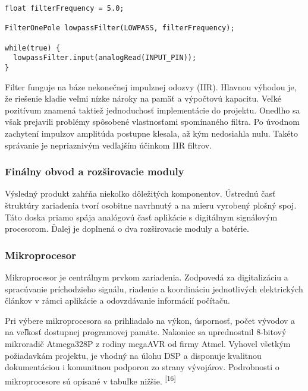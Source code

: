 \documentclass[titlepage,12pt]{article}
\begin{document}
\begin{lstlisting}
float filterFrequency = 5.0; 

FilterOnePole lowpassFilter(LOWPASS, filterFrequency);

while(true) {
  lowpassFilter.input(analogRead(INPUT_PIN));
}
\end{lstlisting}

Filter funguje na báze nekonečnej impulznej odozvy (IIR). Hlavnou výhodou je, že riešenie kladie veľmi nízke nároky na pamäť a výpočtovú kapacitu. Veľké pozitívum znamená taktiež jednoduchosť implementácie do projektu. Onedlho sa však prejavili problémy spôsobené vlastnosťami spomínaného filtra. Po úvodnom zachytení impulzov amplitúda postupne klesala, až kým nedosiahla nulu. Takéto správanie je nepriaznivým vedľajším účinkom IIR filtrov. 

\newpage
\subsubsection{Finálny obvod a rozširovacie moduly}
Výsledný produkt zahŕňa niekoľko dôležitých komponentov. Ústrednú časť štruktúry \linebreak zariadenia tvorí osobitne navrhnutý a na mieru vyrobený plošný spoj. Táto doska priamo spája analógovú časť aplikácie s digitálnym signálovým procesorom. Ďalej je doplnená o dva rozširovacie moduly a batérie.

\subsubsection*{Mikroprocesor}
Mikroprocesor je centrálnym prvkom zariadenia. Zodpovedá za digitalizáciu a spracúvanie príchodzieho signálu, riadenie a koordináciu jednotlivých elektrických článkov v rámci aplikácie a odovzdávanie informácií počítaču.

Pri výbere mikroprocesora sa prihliadalo na výkon, úspornosť, počet vývodov a na veľkosť dostupnej programovej pamäte. Nakoniec sa uprednostnil 8-bitový mikroradič Atmega328P z rodiny megaAVR od firmy Atmel. Vyhovel všetkým požiadavkám projektu, je vhodný na úlohu DSP a disponuje kvalitnou dokumentáciou i komunitnou podporou zo strany vývojárov. 
Podrobnosti o mikroprocesore sú opísané v tabuľke nižšie. \textsuperscript{[16]}
\end{document}
